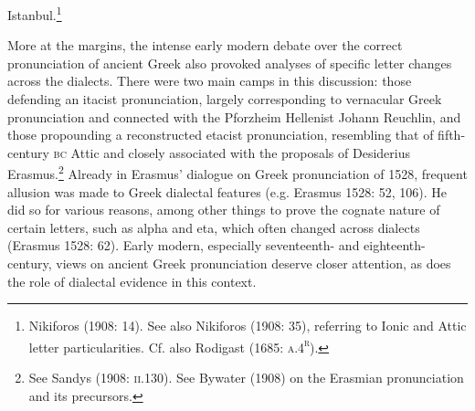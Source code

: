 \begin{styleStandard}
Istanbul.\footnote{\textrm{ Nikiforos (1908: 14). See also Nikiforos (1908: 35), referring to Ionic and Attic letter particularities. Cf. }also Rodigast (1685: \textsc{a.4}\textsc{\textsuperscript{r}}).}
\end{styleStandard}

\begin{styleStandard}
More at the margins, the intense early modern debate over the correct pronunciation of ancient Greek also provoked analyses of specific letter changes across the dialects. There were two main camps in this discussion: those defending an itacist pronunciation, largely corresponding to vernacular Greek pronunciation and connected with the Pforzheim Hellenist Johann Reuchlin, and those propounding a reconstructed etacist pronunciation, resembling that of fifth-century \textsc{bc} Attic and closely associated with the proposals of Desiderius Erasmus.\footnote{ See Sandys (1908: \textsc{ii.}130). See Bywater (1908) on the Erasmian pronunciation and its precursors.} Already in Erasmus’ dialogue on Greek pronunciation of 1528, frequent allusion was made to Greek dialectal features (e.g. Erasmus 1528: 52, 106). He did so for various reasons, among other things to prove the cognate nature of certain letters, such as alpha and eta, which often changed across dialects (Erasmus 1528: 62). Early modern, especially seventeenth- and eighteenth-century, views on ancient Greek pronunciation deserve closer attention, as does the role of dialectal evidence in this context.
\end{styleStandard}

